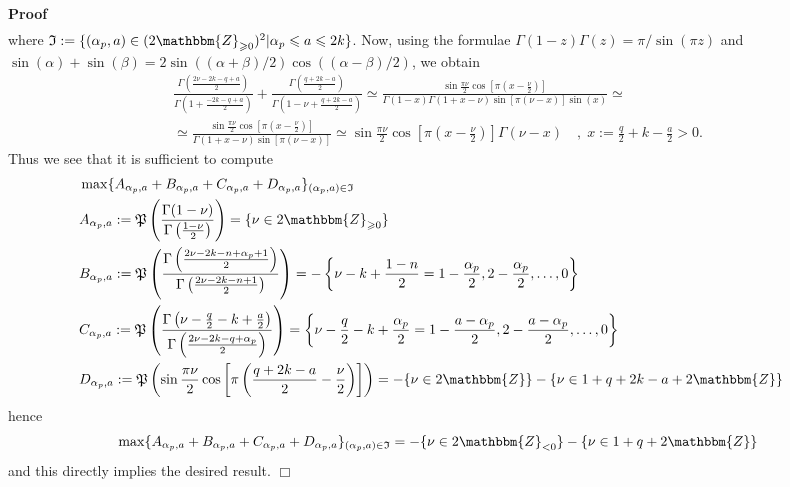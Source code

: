 \documentclass{article}
\newcommand{\assign}{:=}
\newenvironment{proof}{\noindent\textbf{Proof\ }}{\hspace*{\fill}$\Box$\medskip}
\numberwithin{definition}{section}
\numberwithin{lemma}{section}
\numberwithin{proposition}{section}
{\theorembodyfont{\rmfamily}\newtheorem{remark}{Remark}
\numberwithin{remark}{section}
}
\begin{document}
\begin{proof}
\begin{eqnarray}
    \nonumber
  \end{eqnarray}
  where $\mathfrak{I} \assign \{ ( \alpha_p, a) \in ( 2\mathbbm{Z}_{\geqslant
  0})^2 | \alpha_p \leqslant a \leqslant 2 k \}$. Now, using the formulae
  $\Gamma ( 1 - z) \Gamma ( z) = \pi / \sin ( \pi z)$ and $\sin ( \alpha) +
  \sin ( \beta) = 2 \sin ( ( \alpha + \beta) / 2) \cos ( ( \alpha - \beta) /
  2)$, we obtain
  \begin{eqnarray}
    & \frac{\Gamma \left( \frac{2 \nu - 2 k - q + a}{2} \right)}{\Gamma
    \left( 1 + \frac{- 2 k - q + a}{2} \right)} + \frac{\Gamma \left( \frac{q
    + 2 k - a}{2} \right)}{\Gamma \left( 1 - \nu + \frac{q + 2 k - a}{2}
    \right)} \simeq \frac{\sin \frac{\pi \nu}{2} \cos \left[ \pi \left( x -
    \frac{\nu}{2} \right) \right]}{\Gamma ( 1 - x) \Gamma ( 1 + x - \nu) \sin
    [ \pi ( \nu - x)] \sin ( x)} \simeq &  \nonumber\\
    & \simeq \frac{\sin \frac{\pi \nu}{2} \cos \left[ \pi \left( x -
    \frac{\nu}{2} \right) \right]}{\Gamma ( 1 + x - \nu) \sin [ \pi ( \nu -
    x)]} \simeq \sin \frac{\pi \nu}{2} \cos \left[ \pi \left( x -
    \frac{\nu}{2} \right) \right] \Gamma ( \nu - x) \hspace{1em}, \; x \assign
    \frac{q}{2} + k - \frac{a}{2} > 0. &  \nonumber
  \end{eqnarray}
  Thus we see that it is sufficient to compute
  \begin{eqnarray}
    & \max \{ A_{\alpha_p, a} + B_{\alpha_p, a} + C_{\alpha_p, a} +
    D_{\alpha_p, a} \}_{( \alpha_p, a) \in \mathfrak{I}} &  \nonumber\\
    & A_{\alpha_p, a} \assign \mathfrak{P} \left( \frac{\Gamma ( 1 -
    \nu)}{\Gamma \left( \frac{1 - \nu}{2} \right)} \right) = \{ \nu \in
    2\mathbbm{Z}_{\geqslant 0} \} &  \nonumber\\
    & B_{\alpha_p, a} \assign \mathfrak{P} \left( \frac{\Gamma \left( \frac{2
    \nu - 2 k - n + \alpha_p + 1}{2} \right)}{\Gamma \left( \frac{2 \nu - 2 k
    - n + 1}{2} \right)} \right) = - \left\{ \nu - k + \frac{1 - n}{2} = 1 -
    \frac{\alpha_p}{2}, 2 - \frac{\alpha_p}{2}, \ldots, 0 \right\} & 
    \nonumber\\
    & C_{\alpha_p, a} \assign \mathfrak{P} \left( \frac{\Gamma \left( \nu -
    \frac{q}{2} - k + \frac{a}{2} \right)}{\Gamma \left( \frac{2 \nu - 2 k - q
    + \alpha_p}{2} \right)} \right) = \left\{ \nu - \frac{q}{2} - k +
    \frac{\alpha_p}{2} = 1 - \frac{a - \alpha_p}{2}, 2 - \frac{a -
    \alpha_p}{2}, \ldots, 0 \right\} &  \nonumber\\
    & D_{\alpha_p, a} \assign \mathfrak{P} \left( \sin \frac{\pi \nu}{2} \cos
    \left[ \pi \left( \frac{q + 2 k - a}{2} - \frac{\nu}{2} \right) \right]
    \right) = - \{ \nu \in 2\mathbbm{Z} \} - \{ \nu \in 1 + q + 2 k - a +
    2\mathbbm{Z} \} &  \nonumber
  \end{eqnarray}
  hence
  \[ \max \{ A_{\alpha_p, a} + B_{\alpha_p, a} + C_{\alpha_p, a} +
     D_{\alpha_p, a} \}_{( \alpha_p, a) \in \mathfrak{I}} = - \{ \nu \in
     2\mathbbm{Z}_{< 0} \} - \{ \nu \in 1 + q + 2\mathbbm{Z} \} \]
  and this directly implies the desired result.
\end{proof}
\end{document}
